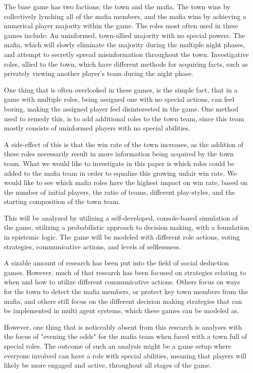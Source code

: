 The base game has two factions; the town and the mafia. The town wins by
collectively lynching all of the mafia members, and the mafia wins by achieving
a numerical player majority within the game. The roles most often used in these
games include: An uninformed, town-allied majority with no special powers. The
mafia, which will slowly eliminate the majority during the multiple night
phases, and attempt to secretly spread misinformation throughout the town.
Investigative roles, allied to the town, which have different methods for
acquiring facts, such as privately viewing another player’s team during the
night phase.

One thing that is often overlooked in these games, is the simple fact, that in
a game with multiple roles, being assigned one with no special actions, can
feel boring, making the assigned player feel disinterested in the game. One
method used to remedy this, is to add additional roles to the town team, since
this team mostly consists of uninformed players with no special abilities.

A side-effect of this is that the win rate of the town increases, as the
addition of these roles necessarily result in more information being acquired
by the town team. What we would like to investigate in this paper is which
roles could be added to the mafia team in order to equalize this growing unfair
win rate. We would like to see which mafia roles have the highest impact on win
rate, based on the number of initial players, the ratio of teams, different
play-styles, and the starting composition of the town team.

This will be analyzed by utilizing a self-developed, console-based simulation
of the game, utilizing a probabilistic approach to decision making, with a
foundation in epistemic logic. The game will be modeled with different role
actions, voting strategies, communicative actions, and levels of selflessness.

A sizable amount of research has been put into the field of social deduction
games. However, much of that research has been focused on strategies relating
to when and how to utilize different communicative actions\cite{commitment}.
Others focus on ways for the town to detect the mafia
members\cite{werewolf_stealth}, or protect key town members from the
mafia\cite{werewolf_nash_equilibrium}, and others still focus on the different
decision making strategies that can be implemented in multi agent systems,
which these games can be modeled
as\cite{modelling_multi_agent_epistemic_systems}\cite{multi_agent_epistemic_planner_common_knowledge}\cite{probibalistic_multiagent_systems}.

However, one thing that is noticeably absent from this research is analyses
with the focus of "evening the odds" for the mafia team when faced with a town
full of special roles. The outcome of such an analysis might be a game setup
where everyone involved can have a role with special abilities, meaning that
players will likely be more engaged and active, throughout all stages of the
game.